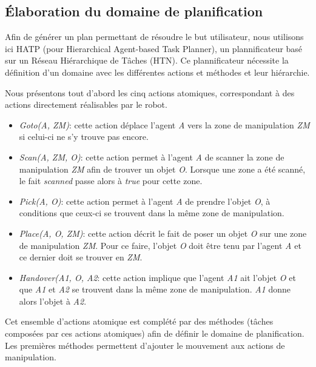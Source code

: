 \documentclass[a4paper,11pt,twoside]{StyleThese}
\begin{document}
\subsection{Élaboration du domaine de planification}
\label{sec:domainehatp}

Afin de générer un plan permettant de résoudre le but utilisateur, nous utilisons ici HATP \cite{lallement14} (pour Hierarchical Agent-based Task Planner), un plannificateur basé sur un Réseau Hiérarchique de Tâches (HTN).
Ce plannificateur nécessite la définition d'un domaine avec les différentes actions et méthodes et leur hiérarchie.

Nous présentons tout d'abord les cinq actions atomiques, correspondant à des actions directement réalisables par le robot.

\begin{itemize}
\item \textit{Goto(A, ZM)}: cette action déplace l'agent \textit{A} vers la zone de manipulation \textit{ZM} si celui-ci ne s'y trouve pas encore.
\item \textit{Scan(A, ZM, O)}: cette action permet à l'agent \textit{A} de scanner la zone de manipulation \textit{ZM} afin de trouver un objet \textit{O}.
Lorsque une zone a été scanné, le fait \textit{scanned} passe alors à \textit{true} pour cette zone.
\item \textit{Pick(A, O)}: cette action permet à l'agent \textit{A} de prendre l'objet \textit{O}, à conditions que ceux-ci se trouvent dans la même zone de manipulation.
\item \textit{Place(A, O, ZM)}: cette action décrit le fait de poser un objet \textit{O} sur une zone de manipulation \textit{ZM}. Pour ce faire, l'objet \textit{O} doit être tenu par l'agent \textit{A} et ce dernier doit se trouver en \textit{ZM}.
\item \textit{Handover(A1, O, A2}: cette action implique que l'agent \textit{A1} ait l'objet \textit{O} et que \textit{A1} et \textit{A2} se trouvent dans la même zone de manipulation. \textit{A1} donne alors l'objet à \textit{A2}.
\end{itemize}
 
 Cet ensemble d'actions atomique est complété par des méthodes (tâches composées par ces actions atomiques) afin de définir le domaine de planification.
 Les premières méthodes permettent d'ajouter le mouvement aux actions de manipulation.
 
\end{document}
